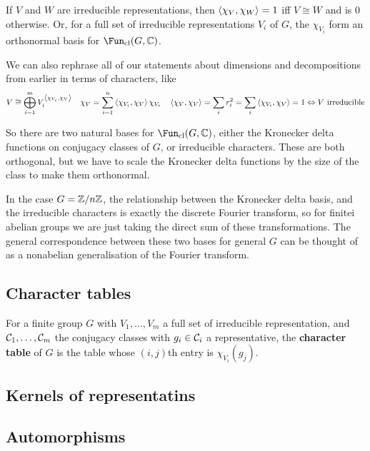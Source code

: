 \documentclass{article}
\begin{document}
\begin{corollary}
    If $V$ and $W$ are irreducible representations, then $\left\langle \chi_V,\chi_W \right\rangle=1$ iff $V\cong W$ and is $0$ otherwise. Or, for a full set of irreducible representations $V_i$ of $G$, the $\chi_{V_i}$ form an orthonormal basis for $\Fun_\text{cl}(G,\bC)$.
\end{corollary}

We can also rephrase all of our statements about dimensions and decompositions from earlier in terms of characters, like \[
V\cong \bigoplus_{i=1}^m V_i^{\left\langle \chi_{V_i},\chi_V \right\rangle} \quad \chi_V = \sum_{i=1}^n \left\langle \chi_{V_i},\chi_V \right\rangle\chi_{V_i} \quad \left\langle \chi_V,\chi_V \right\rangle = \sum_{i}r_i^2 = \sum_i\left\langle \chi_{V_i},\chi_V \right\rangle = 1 \Leftrightarrow V \text{ irreducible}
\]

So there are two natural bases for $\Fun_\text{cl}(G,\bC)$, either the Kronecker delta functions on conjugacy classes of $G$, or irreducible characters. These are both orthogonal, but we have to scale the Kronecker delta functions by the size of the class to make them orthonormal.

In the case $G=\mathbb{Z}/n\mathbb{Z}$, the relationship between the Kronecker delta basis, and the irreducible characters is exactly the discrete Fourier transform, so for finitei abelian groups we are just taking the direct sum of these transformations. The general correspondence between these two bases for general $G$ can be thought of as a nonabelian generalisation of the Fourier transform.

\subsection{Character tables}

\begin{definition}
    For a finite group $G$ with $V_1,\ldots,V_m$ a full set of irreducible representation, and $\mathcal{C}_1,\ldots,\mathcal{C}_m$ the conjugacy classes with $g_i\in \mathcal{C}_i$ a representative, the \textbf{character table} of $G$ is the table whose $(i,j)$th entry is $\chi_{V_i}(g_j)$.
\end{definition}

\subsection{Kernels of representatins}

\subsection{Automorphisms}
\end{document}
